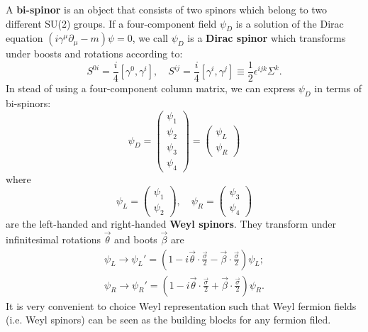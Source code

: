 \documentclass[12pt]{report}
\begin{document}
A \textbf{bi-spinor} is an object that consists of two spinors which belong to two different SU(2) groups.
If a four-component field $\psi_{D}$ is a solution of the Dirac equation $(i \gamma^{\mu} \partial_{\mu} - m) \psi  = 0$, we call $\psi_{D}$ is a \textbf{Dirac spinor} which transforms under boosts and rotations according to:
\begin{equation}
S^{0i} = \frac{i}{4} [\gamma^{0}, \gamma^{i}] , \quad 
S^{ij} = \frac{i}{4} [\gamma^{i}, \gamma^{j}] \equiv \frac{1}{2} \epsilon^{ijk} \Sigma^{k} .
\end{equation}
In stead of using a four-component column matrix, we can express $\psi_{D}$ in terms of bi-spinors:
\begin{equation}
\psi_{D} = \left(\begin{array}{c} \psi_{1} \\ \psi_{2} \\ \psi_{3} \\ \psi_{4} \end{array}\right) = \left(\begin{array}{c} \psi_{L} \\ \psi_{R} \end{array}\right)
\end{equation}
where
\begin{equation}
\psi_{L} = \left(\begin{array}{c} \psi_{1} \\ \psi_{2} \end{array}\right), \quad 
\psi_{R} = \left(\begin{array}{c} \psi_{3} \\ \psi_{4} \end{array}\right)
\end{equation}
are the left-handed and right-handed \textbf{Weyl spinors}.
They transform under infinitesimal rotations $\vec{\theta}$ and boots $\vec{\beta}$ are
\begin{eqnarray}
\psi_{L} \to \psi_{L}' = (1 - i \vec{\theta} \cdot \frac{\vec{\sigma}}{2} - \vec{\beta} \cdot \frac{\vec{\sigma}}{2}) \psi_{L} ;\\
\psi_{R} \to \psi_{R}' = (1 - i \vec{\theta} \cdot \frac{\vec{\sigma}}{2} + \vec{\beta} \cdot \frac{\vec{\sigma}}{2}) \psi_{R} .
\end{eqnarray}
It is very convenient to choice Weyl representation such that Weyl fermion fields (i.e. Weyl spinors) can be seen as the building blocks for any fermion filed.
\end{document}

